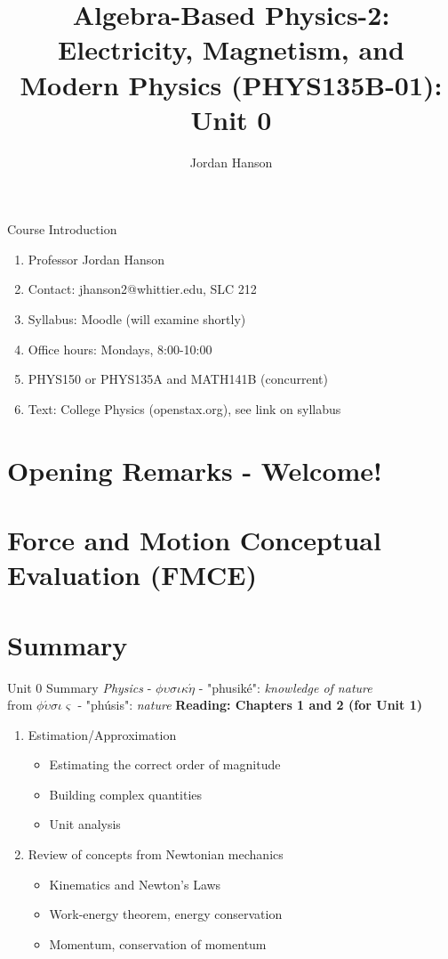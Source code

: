 \documentclass{beamer}
\title{Algebra-Based Physics-2: Electricity, Magnetism, and Modern Physics (PHYS135B-01): Unit 0}
\author{Jordan Hanson}
\institute{Whittier College Department of Physics and Astronomy}
\begin{document}
\maketitle

\begin{frame}{Course Introduction}
\begin{enumerate}
\item Professor Jordan Hanson
\item Contact: jhanson2@whittier.edu, SLC 212
\item Syllabus: Moodle (will examine shortly)
\item Office hours: Mondays, 8:00-10:00
\item PHYS150 or PHYS135A and MATH141B (concurrent)
\item Text: College Physics (openstax.org), see link on syllabus
\end{enumerate}
\end{frame}

\section{Opening Remarks - Welcome!}

\section{Force and Motion Conceptual Evaluation (FMCE)}

\section{Summary}

\begin{frame}{Unit 0 Summary}
\textit{Physics} - $\phi\upsilon\sigma\iota\kappa\acute{\eta}$ - "phusik\'e": \textit{knowledge of nature} \\
from $\phi\acute{\upsilon}\sigma\iota\varsigma$ - "ph\'usis": \textit{nature}
\textbf{Reading: Chapters 1 and 2 (for Unit 1)}
\begin{enumerate}
\item Estimation/Approximation
\begin{itemize}
\item \alert{Estimating} the correct order of magnitude
\item \alert{Building} complex quantities
\item \alert{Unit analysis}
\end{itemize}
\item Review of concepts from Newtonian mechanics
\begin{itemize}
\item Kinematics and \alert{Newton's Laws}
\item Work-energy theorem, energy conservation
\item Momentum, conservation of momentum
\end{itemize}
\end{enumerate}
\end{frame}
\end{document}
